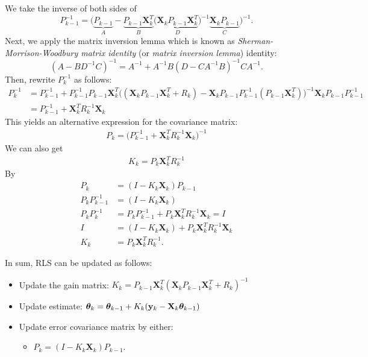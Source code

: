 We take the inverse of both sides of 
$$P_{k-1}^{-1} = \bigg(\underbrace{P_{k-1}}_{A}-\underbrace{P_{k-1}\mathbf{X}_k^T}_{B}\big(\underbrace{\mathbf{X}_kP_{k-1}\mathbf{X}_k^T}_{D}\big)^{-1}\underbrace{\mathbf{X}_kP_{k-1}}_{C}\bigg)^{-1}.$$
Next, we apply the matrix inversion lemma which is known as \textit{Sherman-Morrison-Woodbury matrix identity} (or \textit{matrix inversion lemma}) identity: 
$$(A-BD^{-1}C)^{-1} = A^{-1}+A^{-1}B(D-CA^{-1}B)^{-1}CA^{-1}.$$
Then, rewrite $P_k^{-1}$ as follows:
\begin{align*}
	P_k^{-1} &= P_{k-1}^{-1}+P_{k-1}^{-1}P_{k-1}\mathbf{X}_k^T\big((\mathbf{X}_kP_{k-1}\mathbf{X}_k^T+R_k)-\mathbf{X}_kP_{k-1}P_{k-1}^{-1}(P_{k-1}\mathbf{X}_k^T)\big)^{-1}\mathbf{X}_kP_{k-1}P_{k-1}^{-1}\\ 
			 &= P_{k-1}^{-1}+\mathbf{X}_k^TR_{k}^{-1}\mathbf{X}_k
\end{align*}
This yields an alternative expression for the covariance matrix:
\begin{align*}
	P_k = \big(P_{k-1}^{-1}+\mathbf{X}_k^TR_{k}^{-1}\mathbf{X}_k\big)^{-1}
\end{align*}
We can also get
\begin{align*}
	K_k = P_{k}\mathbf{X}_k^TR_{k}^{-1}
\end{align*}
By
\begin{align*}
	P_k &= (I-K_k\mathbf{X}_k)P_{k-1}\\
	P_kP_{k-1}^{-1} &= (I-K_k\mathbf{X}_k)\\
	P_kP_k^{-1} &= P_kP_{k-1}^{-1}+P_k\mathbf{X}_k^TR_{k}^{-1}\mathbf{X}_k=I\\
	I &= (I-K_k\mathbf{X}_k)+P_k\mathbf{X}_k^TR_{k}^{-1}\mathbf{X}_k\\
	K_k &= P_{k}\mathbf{X}_k^TR_{k}^{-1}.
\end{align*}

In sum, RLS can be updated as follows: 
\begin{itemize}
	\item Update the gain matrix: $K_k = P_{k-1}\mathbf{X}_k^T(\mathbf{X}_kP_{k-1}\mathbf{X}_k^T+R_k)^{-1}$
	\item Update estimate: $\boldsymbol{\theta}_k = \boldsymbol{\theta}_{k-1}+K_k ({\mathbf{y}}_k-\mathbf{X}_k\boldsymbol{\theta}_{k-1})$
	\item Update error covariance matrix by either: 
		\begin{itemize}
			\item $P_k = (I-K_k\mathbf{X}_k)P_{k-1}$.
		\end{itemize}
\end{itemize}






